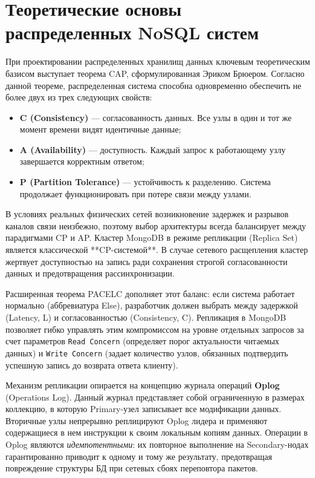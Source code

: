 \documentclass[a4paper,14pt]{extarticle}
\begin{document}
	\section{Теоретические основы распределенных NoSQL систем}
	При проектировании распределенных хранилищ данных ключевым теоретическим базисом выступает теорема CAP, сформулированная Эриком Брюером. Согласно данной теореме, распределенная система способна одновременно обеспечить не более двух из трех следующих свойств:
	\begin{itemize}
		\item \textbf{C (Consistency)} — согласованность данных. Все узлы в один и тот же момент времени видят идентичные данные;
		\item \textbf{A (Availability)} — доступность. Каждый запрос к работающему узлу завершается корректным ответом;
		\item \textbf{P (Partition Tolerance)} — устойчивость к разделению. Система продолжает функционировать при потере связи между узлами.
	\end{itemize}
	
	В условиях реальных физических сетей возникновение задержек и разрывов каналов связи неизбежно, поэтому выбор архитектуры всегда балансирует между парадигмами CP и AP. Кластер MongoDB в режиме репликации (Replica Set) является классической **CP-системой**. В случае сетевого расщепления кластер жертвует доступностью на запись ради сохранения строгой согласованности данных и предотвращения рассинхронизации.
	
	Расширенная теорема PACELC дополняет этот баланс: если система работает нормально (аббревиатура Else), разработчик должен выбрать между задержкой (Latency, L) и согласованностью (Consistency, C). Репликация в MongoDB позволяет гибко управлять этим компромиссом на уровне отдельных запросов за счет параметров \texttt{Read Concern} (определяет порог актуальности читаемых данных) и \texttt{Write Concern} (задает количество узлов, обязанных подтвердить успешную запись до возврата ответа клиенту).
	
	Механизм репликации опирается на концепцию журнала операций \textbf{Oplog} (Operations Log). Данный журнал представляет собой ограниченную в размерах коллекцию, в которую Primary-узел записывает все модификации данных. Вторичные узлы непрерывно реплицируют Oplog лидера и применяют содержащиеся в нем инструкции к своим локальным копиям данных. Операции в Oplog являются \textit{идемпотентными}: их повторное выполнение на Secondary-нодах гарантированно приводит к одному и тому же результату, предотвращая повреждение структуры БД при сетевых сбоях переповтора пакетов.
	
\end{document}
